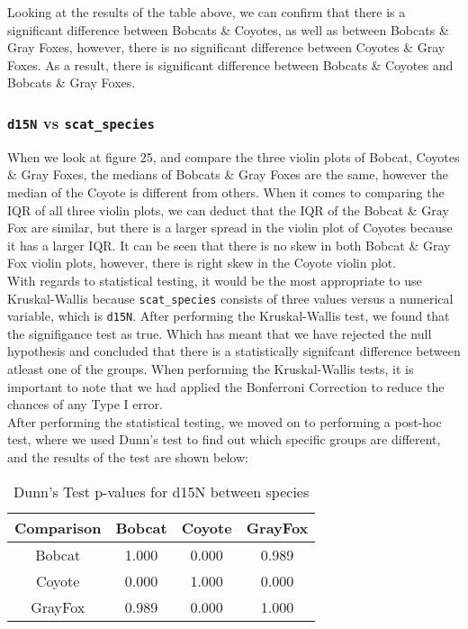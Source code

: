 \documentclass[a4paper]{article}
\begin{document}
\noindent Looking at the results of the table above, we can confirm that there is a significant difference between Bobcats \& Coyotes, as well as between
Bobcats \& Gray Foxes, however, there is  no significant difference between Coyotes \& Gray Foxes. As a result, there is significant difference between 
Bobcats \& Coyotes and Bobcats \& Gray Foxes.

\subsubsection{\texttt{d15N} vs \texttt{scat\_species}}
When we look at figure 25, and compare the three violin plots of Bobcat, Coyotes \& Gray Foxes, the medians of Bobcats \& Gray Foxes are the same, however
the median of the Coyote is different from others. When it comes to comparing the IQR of all three violin plots, we can deduct that the IQR of the Bobcat \&
Gray Fox are similar, but there is a larger spread in the violin plot of Coyotes because it has a larger IQR. It can be seen that there is no skew in both
Bobcat \& Gray Fox violin plots, however, there is right skew in the Coyote violin plot. \\

\noindent With regards to statistical testing, it would be the most appropriate to use Kruskal-Wallis because \texttt{scat\_species} consists of three values
versus a numerical variable, which is \texttt{d15N}. After performing the Kruskal-Wallis test, we found that the signifigance test as true. Which has meant 
that we have rejected the null hypothesis and concluded that there is a statistically signifcant difference between atleast one of the groups. When performing 
the Kruskal-Wallis tests, it is important to note that we had applied the Bonferroni Correction to reduce the chances of any Type I error. \\

\noindent After performing the statistical testing, we moved on to performing a post-hoc test, where we used Dunn's test to find out which specific groups are
different, and the results of the test are shown below: \\

\begin{table}[h!]
    \centering
    \begin{tabular}{|c|c|c|c|}
    \hline
    \textbf{Comparison} & \textbf{Bobcat} & \textbf{Coyote} & \textbf{GrayFox} \\
    \hline
    Bobcat & 1.000 & 0.000 & 0.989 \\
    \hline
    Coyote & 0.000 & 1.000 & 0.000 \\
    \hline
    GrayFox & 0.989 & 0.000 & 1.000 \\
    \hline
    \end{tabular}
    \caption{Dunn's Test p-values for d15N between species}
    \label{tab:dunn_d15N}
\end{table}
\end{document}

